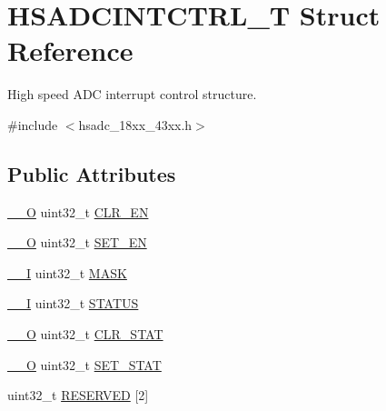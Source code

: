 \hypertarget{struct_h_s_a_d_c_i_n_t_c_t_r_l___t}{}\section{H\+S\+A\+D\+C\+I\+N\+T\+C\+T\+R\+L\+\_\+T Struct Reference}
\label{struct_h_s_a_d_c_i_n_t_c_t_r_l___t}


High speed A\+DC interrupt control structure.  




{\ttfamily \#include $<$hsadc\+\_\+18xx\+\_\+43xx.\+h$>$}

\subsection*{Public Attributes}
\begin{DoxyCompactItemize}
\item 
\hyperlink{core__sc300_8h_a7e25d9380f9ef903923964322e71f2f6}{\+\_\+\+\_\+O} uint32\+\_\+t \hyperlink{struct_h_s_a_d_c_i_n_t_c_t_r_l___t_aecdb98966b688846b68ea7ddd9347271}{C\+L\+R\+\_\+\+EN}
\item 
\hyperlink{core__sc300_8h_a7e25d9380f9ef903923964322e71f2f6}{\+\_\+\+\_\+O} uint32\+\_\+t \hyperlink{struct_h_s_a_d_c_i_n_t_c_t_r_l___t_adf160575f5914205a4bc04e6d68992b6}{S\+E\+T\+\_\+\+EN}
\item 
\hyperlink{core__sc300_8h_af63697ed9952cc71e1225efe205f6cd3}{\+\_\+\+\_\+I} uint32\+\_\+t \hyperlink{struct_h_s_a_d_c_i_n_t_c_t_r_l___t_a13d4eb694eca0fc2cda3aeff0ea91677}{M\+A\+SK}
\item 
\hyperlink{core__sc300_8h_af63697ed9952cc71e1225efe205f6cd3}{\+\_\+\+\_\+I} uint32\+\_\+t \hyperlink{struct_h_s_a_d_c_i_n_t_c_t_r_l___t_a25e9a6bc46c055d245ed25759ea36393}{S\+T\+A\+T\+US}
\item 
\hyperlink{core__sc300_8h_a7e25d9380f9ef903923964322e71f2f6}{\+\_\+\+\_\+O} uint32\+\_\+t \hyperlink{struct_h_s_a_d_c_i_n_t_c_t_r_l___t_a9912db69ac4663ccef65a1acb5317ebe}{C\+L\+R\+\_\+\+S\+T\+AT}
\item 
\hyperlink{core__sc300_8h_a7e25d9380f9ef903923964322e71f2f6}{\+\_\+\+\_\+O} uint32\+\_\+t \hyperlink{struct_h_s_a_d_c_i_n_t_c_t_r_l___t_a843f7fb20666584fc5af715bf83856a6}{S\+E\+T\+\_\+\+S\+T\+AT}
\item 
uint32\+\_\+t \hyperlink{struct_h_s_a_d_c_i_n_t_c_t_r_l___t_ac0d50aebb9a60e18a7691fc307bcf641}{R\+E\+S\+E\+R\+V\+ED} \mbox{[}2\mbox{]}
\end{DoxyCompactItemize}


